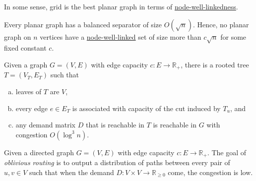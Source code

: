 In some sense, grid is the best planar graph in terms of \hyperref[def:node-well-linked]{node-well-linkedness}.

\begin{theorem}
	Every planar graph has a balanced separator of size \(O(\sqrt{n} )\). Hence, no planar graph on \(n\) vertices have a \hyperref[def:node-well-linked]{node-well-linked} set of size more than \(c \sqrt{n} \) for some fixed constant \(c\).
\end{theorem}

\begin{theorem}
	Given a graph \(G = (V, E)\) with edge capacity \(c \colon E \to \mathbb{R} _+\), there is a rooted tree \(T = (V_T, E_T)\) such that
	\begin{enumerate}[(a)]
		\item leaves of \(T\) are \(V\),
		\item every edge \(e \in E_T\) is associated with capacity of the cut induced by \(T_u\), and
		\item any demand matrix \(D\) that is reachable in \(T\) is reachable in \(G\) with congestion \(O(\log ^3 n)\).
	\end{enumerate}
\end{theorem}

\begin{problem}\label{def:oblivious-routing}
Given a directed graph \(G = (V, E)\) with edge capacity \(c \colon E \to \mathbb{R} _+\). The goal of \emph{oblivious routing} is to output a distribution of paths between every pair of \(u, v \in V\) such that when the demand \(D \colon V \times V \to \mathbb{R} _{\geq 0}\) come, the congestion is low.
\end{problem}